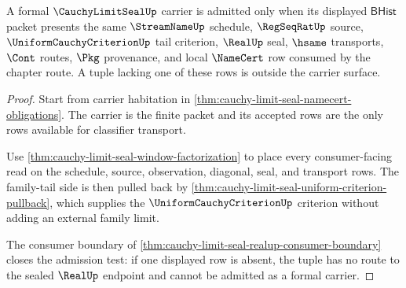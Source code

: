 \begin{theorem}
\label{thm:cauchy-limit-seal-lean-carrier-admission}
A formal $\CauchyLimitSealUp$ carrier is admitted only when its displayed $\mathsf{BHist}$ packet presents the same $\StreamNameUp$ schedule, $\RegSeqRatUp$ source, $\UniformCauchyCriterionUp$ tail criterion, $\RealUp$ seal, $\hsame$ transports, $\Cont$ routes, $\Pkg$ provenance, and local $\NameCert$ row consumed by the chapter route. A tuple lacking one of these rows is outside the carrier surface.
\end{theorem}
\begin{proof}
Start from carrier habitation in \autoref{thm:cauchy-limit-seal-namecert-obligations}. The carrier is the finite packet and its accepted rows are the only rows available for classifier transport.

Use \autoref{thm:cauchy-limit-seal-window-factorization} to place every consumer-facing read on the schedule, source, observation, diagonal, seal, and transport rows. The family-tail side is then pulled back by \autoref{thm:cauchy-limit-seal-uniform-criterion-pullback}, which supplies the $\UniformCauchyCriterionUp$ criterion without adding an external family limit.

The consumer boundary of \autoref{thm:cauchy-limit-seal-realup-consumer-boundary} closes the admission test: if one displayed row is absent, the tuple has no route to the sealed $\RealUp$ endpoint and cannot be admitted as a formal carrier.
\end{proof}

